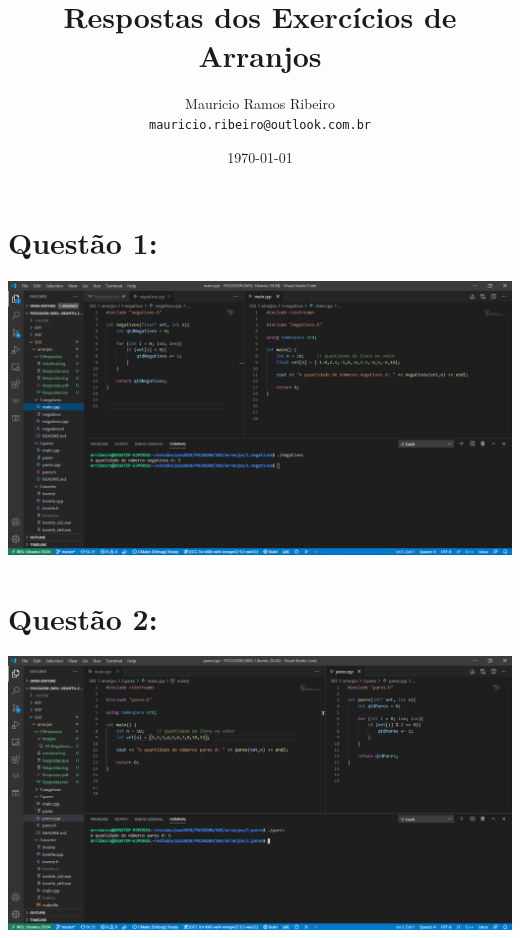 \documentclass{article}
\author{
  Mauricio Ramos Ribeiro\\
  \texttt{mauricio.ribeiro@outlook.com.br}
}
\title{Respostas dos Exercícios de Arranjos}
\date{\today}
\begin{document}
\maketitle

\vspace{15mm}


\section*{Questão 1:}

\includegraphics[scale=0.4]{01.Negativos.png}
\vspace{15mm}


\section*{Questão 2:}

\includegraphics[scale=0.4]{02.Pares.png}
\vspace{15mm}
\end{document}
